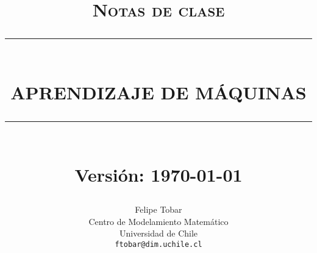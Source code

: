 
\newcommand{\HRule}[1]{\rule{\linewidth}{#1}} 	%

\makeatletter							%
\def\printtitle{%
    {\centering \@title\par}}
\makeatother									

\makeatletter							%
\def\printauthor{%
    {\centering \large \@author}}				
\makeatother							

\title{	\normalsize \textsc{Notas de clase} 	%
		 	\\[6.0cm]								%
			\HRule{0.5pt} \\						%
			 \textbf{\uppercase{\LARGE Aprendizaje de Máquinas}}	%
			\HRule{2pt} \\ [0.5cm]		%
			\large Versión: \today			%
		}

\author{
		Felipe Tobar\\	
		Centro de Modelamiento Matemático\\	
		Universidad de Chile\\
        \texttt{ftobar@dim.uchile.cl} \\[1.0cm]
}
